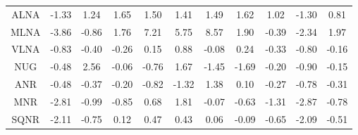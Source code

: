 \documentclass[11pt,a4paper]{report}
\begin{document}
\begin{longtable}{ | c || c | c | c | c | c | c | c | c | c || c |}
ALNA &  \cellcolor[HTML]{FFDFDF} -1.33 &  \cellcolor[HTML]{DFDFFF} 1.24 &  \cellcolor[HTML]{D7D7FF} 1.65 &  \cellcolor[HTML]{D7D7FF} 1.50 &  \cellcolor[HTML]{DFDFFF} 1.41 &  \cellcolor[HTML]{D7D7FF} 1.49 &  \cellcolor[HTML]{D7D7FF} 1.62 &  \cellcolor[HTML]{E7E7FF} 1.02 &  \cellcolor[HTML]{FFDFDF} -1.30 &  \cellcolor[HTML]{E7E7FF} 0.81 \\
MLNA &  \cellcolor[HTML]{FF9F9F} -3.86 &  \cellcolor[HTML]{FFE7E7} -0.86 &  \cellcolor[HTML]{CFCFFF} 1.76 &  \cellcolor[HTML]{4848FF} 7.21 &  \cellcolor[HTML]{7070FF} 5.75 &  \cellcolor[HTML]{2828FF} 8.57 &  \cellcolor[HTML]{CFCFFF} 1.90 &  \cellcolor[HTML]{FFF7F7} -0.39 &  \cellcolor[HTML]{FFC7C7} -2.34 &  \cellcolor[HTML]{CFCFFF} 1.97 \\
VLNA &  \cellcolor[HTML]{FFE7E7} -0.83 &  \cellcolor[HTML]{FFF7F7} -0.40 &  \cellcolor[HTML]{FFF7F7} -0.26 &  \cellcolor[HTML]{FFFFFF} 0.15 &  \cellcolor[HTML]{E7E7FF} 0.88 &  \cellcolor[HTML]{FFFFFF} -0.08 &  \cellcolor[HTML]{F7F7FF} 0.24 &  \cellcolor[HTML]{FFF7F7} -0.33 &  \cellcolor[HTML]{FFE7E7} -0.80 &  \cellcolor[HTML]{FFF7F7} -0.16 \\
NUG &  \cellcolor[HTML]{FFEFEF} -0.48 &  \cellcolor[HTML]{BFBFFF} 2.56 &  \cellcolor[HTML]{FFFFFF} -0.06 &  \cellcolor[HTML]{FFEFEF} -0.76 &  \cellcolor[HTML]{D7D7FF} 1.67 &  \cellcolor[HTML]{FFD7D7} -1.45 &  \cellcolor[HTML]{FFD7D7} -1.69 &  \cellcolor[HTML]{FFF7F7} -0.20 &  \cellcolor[HTML]{FFE7E7} -0.90 &  \cellcolor[HTML]{FFFFFF} -0.15 \\
ANR &  \cellcolor[HTML]{FFEFEF} -0.48 &  \cellcolor[HTML]{FFF7F7} -0.37 &  \cellcolor[HTML]{FFF7F7} -0.20 &  \cellcolor[HTML]{FFE7E7} -0.82 &  \cellcolor[HTML]{FFDFDF} -1.32 &  \cellcolor[HTML]{DFDFFF} 1.38 &  \cellcolor[HTML]{FFFFFF} 0.10 &  \cellcolor[HTML]{FFF7F7} -0.27 &  \cellcolor[HTML]{FFEFEF} -0.78 &  \cellcolor[HTML]{FFF7F7} -0.31 \\
MNR &  \cellcolor[HTML]{FFB7B7} -2.81 &  \cellcolor[HTML]{FFE7E7} -0.99 &  \cellcolor[HTML]{FFE7E7} -0.85 &  \cellcolor[HTML]{EFEFFF} 0.68 &  \cellcolor[HTML]{CFCFFF} 1.81 &  \cellcolor[HTML]{FFFFFF} -0.07 &  \cellcolor[HTML]{FFEFEF} -0.63 &  \cellcolor[HTML]{FFDFDF} -1.31 &  \cellcolor[HTML]{FFB7B7} -2.87 &  \cellcolor[HTML]{FFEFEF} -0.78 \\
SQNR &  \cellcolor[HTML]{FFC7C7} -2.11 &  \cellcolor[HTML]{FFEFEF} -0.75 &  \cellcolor[HTML]{FFFFFF} 0.12 &  \cellcolor[HTML]{F7F7FF} 0.47 &  \cellcolor[HTML]{F7F7FF} 0.43 &  \cellcolor[HTML]{FFFFFF} 0.06 &  \cellcolor[HTML]{FFFFFF} -0.09 &  \cellcolor[HTML]{FFEFEF} -0.65 &  \cellcolor[HTML]{FFC7C7} -2.09 &  \cellcolor[HTML]{FFEFEF} -0.51 \\

\end{longtable}
\end{document}
